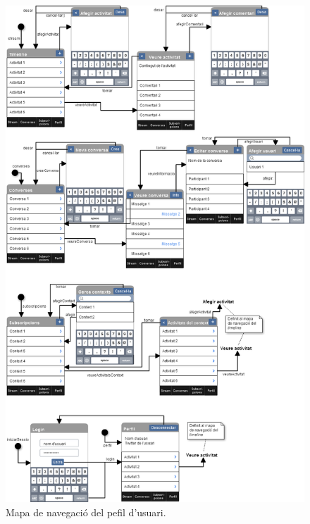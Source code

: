 \begin{figure}[ht]
    \centering
    \includegraphics*[scale=0.5,viewport=0 0 810 340]{Memoria/Arquitectura/Projecte/Presentacio/mapa_de_navegacio.png}
    \caption[Mapa de navegació del pefil d'usuari.]{Mapa de navegació del pefil d'usuari.}
    \label{fig:mapa_nav_perfil}
\end{figure}
\FloatBarrier
